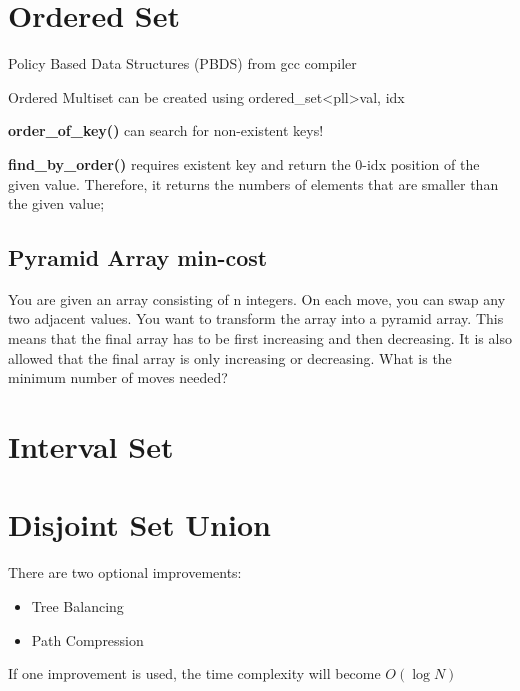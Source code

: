 \section{Ordered Set}

    Policy Based Data Structures (PBDS) from gcc compiler

    Ordered Multiset can be created using ordered\_set\textless pll\textgreater {val, idx}

    \textbf{order\_of\_key()} can search for non-existent keys!
    
    \textbf{find\_by\_order()} requires existent key and return the 0-idx position of the given value.
    Therefore, it returns the numbers of elements that are smaller than the given value;


    \subsection{Pyramid Array min-cost}

    You are given an array consisting of n integers. On each move, you can swap any two adjacent values.
    You want to transform the array into a pyramid array. This means that the final array has to be first increasing and then decreasing. 
    It is also allowed that the final array is only increasing or decreasing.
    What is the minimum number of moves needed?


\section{Interval Set}


\section{Disjoint Set Union}

    There are two optional improvements:

    \begin{itemize}
        \item Tree Balancing 
        \item Path Compression
    \end{itemize}

    If one improvement is used, 
    the time complexity will become $O(\log{N})$

